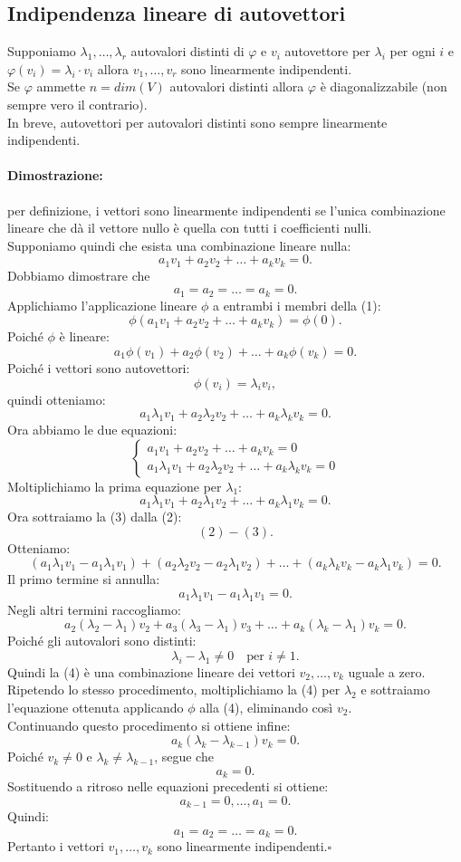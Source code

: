 \documentclass[12pt,a4paper]{article}
\begin{document}
\subsection{Indipendenza lineare di autovettori}
Supponiamo $\lambda_1,\ldots,\lambda_r$ autovalori distinti di $\varphi$ e $v_i$ autovettore per $\lambda_i$ per ogni $i$ e $\varphi(v_i) = \lambda_i \cdot v_i$ allora $v_1,\ldots,v_r$ sono linearmente indipendenti.\\
Se $\varphi$ ammette $n = dim(V)$ autovalori distinti allora $\varphi$ è diagonalizzabile (non sempre vero il contrario).\\
In breve, autovettori per autovalori distinti sono sempre linearmente indipendenti.
\paragraph{Dimostrazione:}per definizione, i vettori sono linearmente indipendenti se l'unica combinazione lineare che dà il vettore nullo è quella con tutti i coefficienti nulli. \\
Supponiamo quindi che esista una combinazione lineare nulla:
\[
a_1 v_1 + a_2 v_2 + \dots + a_k v_k = 0.
\tag{1}
\]
Dobbiamo dimostrare che
\[
a_1 = a_2 = \dots = a_k = 0.
\]
Applichiamo l'applicazione lineare $\phi$ a entrambi i membri della (1):
\[
\phi(a_1 v_1 + a_2 v_2 + \dots + a_k v_k) = \phi(0).
\]
Poiché $\phi$ è lineare:
\[
a_1 \phi(v_1) + a_2 \phi(v_2) + \dots + a_k \phi(v_k) = 0.
\]
Poiché i vettori sono autovettori:
\[
\phi(v_i) = \lambda_i v_i,
\]
quindi otteniamo:
\[
a_1 \lambda_1 v_1 + a_2 \lambda_2 v_2 + \dots + a_k \lambda_k v_k = 0.
\tag{2}
\]
Ora abbiamo le due equazioni:
\[
\begin{cases}
a_1 v_1 + a_2 v_2 + \dots + a_k v_k = 0 \\
a_1 \lambda_1 v_1 + a_2 \lambda_2 v_2 + \dots + a_k \lambda_k v_k = 0
\end{cases}
\]
Moltiplichiamo la prima equazione per $\lambda_1$:
\[
a_1 \lambda_1 v_1 + a_2 \lambda_1 v_2 + \dots + a_k \lambda_1 v_k = 0.
\tag{3}
\]
Ora sottraiamo la (3) dalla (2):
\[
(2) - (3).
\]
Otteniamo:
\[
(a_1 \lambda_1 v_1 - a_1 \lambda_1 v_1)
+ (a_2 \lambda_2 v_2 - a_2 \lambda_1 v_2)
+ \dots +
(a_k \lambda_k v_k - a_k \lambda_1 v_k)
= 0.
\]
Il primo termine si annulla:
\[
a_1 \lambda_1 v_1 - a_1 \lambda_1 v_1 = 0.
\]
Negli altri termini raccogliamo:
\[
a_2(\lambda_2 - \lambda_1)v_2 + a_3(\lambda_3 - \lambda_1)v_3 + \dots + a_k(\lambda_k - \lambda_1)v_k = 0.
\tag{4}
\]
Poiché gli autovalori sono distinti:
\[
\lambda_i - \lambda_1 \neq 0 \quad \text{per } i \neq 1.
\]
Quindi la (4) è una combinazione lineare dei vettori
$v_2, \dots, v_k$ uguale a zero.\\
Ripetendo lo stesso procedimento, moltiplichiamo la (4) per
$\lambda_2$ e sottraiamo l'equazione ottenuta applicando $\phi$
alla (4), eliminando così $v_2$.\\
Continuando questo procedimento si ottiene infine:
\[
a_k(\lambda_k - \lambda_{k-1}) v_k = 0.
\]
Poiché $v_k \neq 0$ e $\lambda_k \neq \lambda_{k-1}$, segue che
\[
a_k = 0.
\]
Sostituendo a ritroso nelle equazioni precedenti si ottiene:
\[
a_{k-1} = 0, \dots, a_1 = 0.
\]
Quindi:
\[
a_1 = a_2 = \dots = a_k = 0.
\]
Pertanto i vettori $v_1, \dots, v_k$ sono linearmente indipendenti.\hfill $\square$
\end{document}
